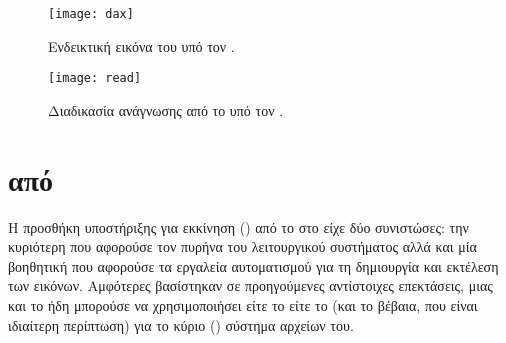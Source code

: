 \begin{figure}
    \centering
    \texttt{[image: dax]}
    \caption{Ενδεικτική εικόνα του  υπό τον .}
    \label{fig:dax-overview}
\end{figure}

\begin{figure}
    \begin{minipage}[c][\textheight]{\textwidth}
        \centering
        \texttt{[image: read]}
        \caption{Διαδικασία ανάγνωσης από το \viofs{} υπό τον .}
        \label{fig:dax-flowchart}
    \end{minipage}
\end{figure}

\section{ από \viofs{}}

Η προσθήκη υποστήριξης για εκκίνηση () από το \viofs{} στο \osv{}
είχε δύο συνιστώσες: την κυριότερη που αφορούσε τον πυρήνα του λειτουργικού
συστήματος αλλά και μία βοηθητική που αφορούσε τα εργαλεία αυτοματισμού για τη
δημιουργία και εκτέλεση των εικόνων. Αμφότερες βασίστηκαν σε προηγούμενες
αντίστοιχες επεκτάσεις, μιας και το \osv{} ήδη μπορούσε να χρησιμοποιήσει
είτε το  είτε το  (και το  βέβαια, που είναι
ιδιαίτερη περίπτωση) για το κύριο () σύστημα αρχείων του.

